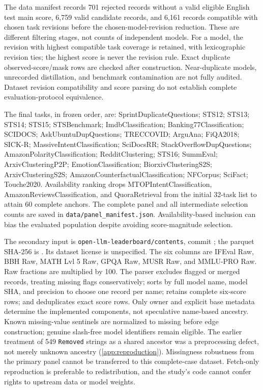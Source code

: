 \documentclass{article}
\begin{document}
The data manifest records 701 rejected records without a valid eligible English test main score, 6,759 valid candidate records, and 6,161 records compatible with chosen task revisions before the chosen-model-revision reduction. These are different filtering stages, not counts of independent models. For a model, the revision with highest compatible task coverage is retained, with lexicographic revision ties; the highest score is never the revision rule. Exact duplicate observed-score/mask rows are checked after construction. Near-duplicate models, unrecorded distillation, and benchmark contamination are not fully audited. Dataset revision compatibility and score parsing do not establish complete evaluation-protocol equivalence.

The final tasks, in frozen order, are: SprintDuplicateQuestions; STS12; STS13; STS14; STS15; STSBenchmark; ImdbClassification; Banking77Classification; SCIDOCS; AskUbuntuDupQuestions; TRECCOVID; ArguAna; FiQA2018; SICK-R; MassiveIntentClassification; SciDocsRR; StackOverflowDupQuestions; AmazonPolarityClassification; RedditClustering; STS16; SummEval; ArxivClusteringP2P; EmotionClassification; BiorxivClusteringS2S; ArxivClusteringS2S; AmazonCounterfactualClassification; NFCorpus; SciFact; Touche2020. Availability ranking drops MTOPIntentClassification, AmazonReviewsClassification, and QuoraRetrieval from the initial 32-task list to attain 60 complete anchors. The complete panel and all intermediate selection counts are saved in \texttt{data/panel\_manifest.json}. Availability-based inclusion can bias the evaluated population despite avoiding score-magnitude selection.

The secondary input is \texttt{open-llm-leaderboard/contents}, commit
\texttt{}; the parquet SHA-256 is
\texttt{}.
Its dataset license is unspecified. The six columns are IFEval Raw, BBH Raw, MATH Lvl 5 Raw, GPQA Raw, MUSR Raw, and MMLU-PRO Raw. Raw fractions are multiplied by 100. The parser excludes flagged or merged records, treating missing flags conservatively; sorts by full model name, model SHA, and precision to choose one record per name; retains complete six-score rows; and deduplicates exact score rows. Only owner and explicit base metadata determine the implemented components, not speculative name-based ancestry. Known missing-value sentinels are normalized to missing before edge construction; genuine slash-free model identifiers remain eligible. The earlier treatment of 549 \texttt{Removed} strings as a shared ancestor was a preprocessing defect, not merely unknown ancestry (\cref{app:reproduction}). Missingness robustness from the primary panel cannot be transferred to this complete-case dataset. Fetch-only reproduction is preferable to redistribution, and the study's code cannot confer rights to upstream data or model weights.
\end{document}
